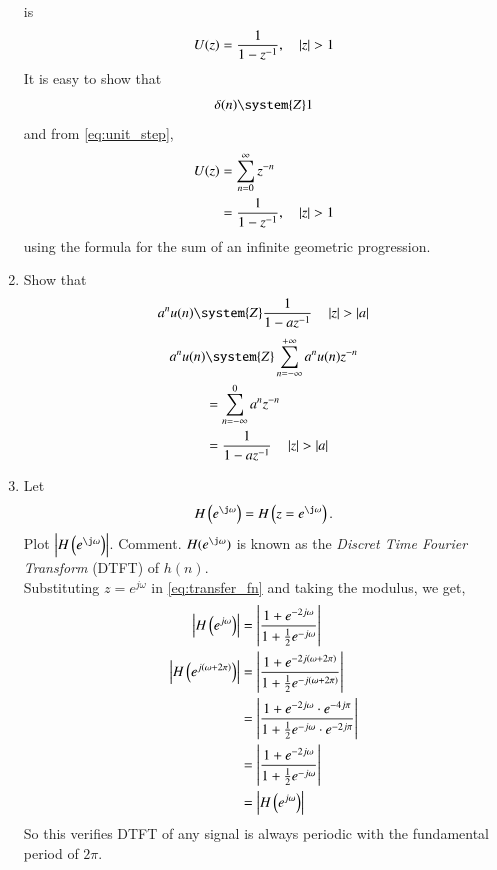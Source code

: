 \documentclass[journal,12pt,twocolumn]{IEEEtran}
\theoremstyle{remark}
\begin{document}
\begin{enumerate}[label=\thesection.\arabic*]
\begin{equation}
\end{equation}
is
\begin{equation}
U(z) = \frac{1}{1-z^{-1}}, \quad \left\vert z\right\vert > 1
\end{equation}
\solution It is easy to show that
\begin{equation}
\delta(n) \system{Z} 1
\end{equation}
and from \eqref{eq:unit_step},
\begin{align}
U(z) &= \sum _{n= 0}^{\infty}z^{-n}
\\
&=\frac{1}{1-z^{-1}}, \quad \left\vert z\right\vert > 1
\end{align}
using the formula for the sum of an infinite geometric progression.
%
\item Show that 
\begin{equation}
\label{eq:anun}
a^nu(n) \system{Z} \frac{1}{1-az^{-1}} \quad \abs{z} > \abs{a}
\end{equation}
\solution 
\begin{align}
    a^nu(n) &\system{Z} \sum_{n=-\infty}^{+\infty}a^nu(n)z^{-n}\\
    &=\sum_{n=-\infty}^{0}a^nz^{-n} \\
    &=\frac{1}{1-az^{-1}} \quad \abs{z} > \abs{a}
\end{align}
%
\item 
Let
\begin{equation}
H\brak{e^{\j \omega}} = H\brak{z = e^{\j \omega}}.
\end{equation}
Plot $\abs{H\brak{e^{\j \omega}}}$.  Comment.  $H(e^{\j \omega})$ is
known as the {\em Discret Time Fourier Transform} (DTFT) of $h(n)$.
\\
\solution
Substituting $z=e^{j\omega}$ in \eqref{eq:transfer_fn} and taking the modulus, we get,
\begin{align}
    \left|H\left(e^{j\omega}\right)\right|&=\left|\frac{1+e^{-2j\omega}}{1+\frac{1}{2}e^{-j\omega}}\right| \\
    \left|H\left(e^{j\left(\omega+2\pi\right)}\right)\right|&=\left|\frac{1+e^{-2j\left(\omega+2\pi\right)}}{1+\frac{1}{2}e^{-j\left(\omega+2\pi\right)}}\right| \\
    &=\left|\frac{1+e^{-2j\omega}\cdot e^{-4j\pi}}{1+\frac{1}{2}e^{-j\omega}\cdot e^{-2j\pi}}\right| \\
    &=\left|\frac{1+e^{-2j\omega}}{1+\frac{1}{2}e^{-j\omega}}\right|\\
    &=\left|H\left(e^{j\omega}\right)\right|
\end{align}
So this verifies DTFT of any signal is always periodic with the fundamental period of $2\pi$.

\end{enumerate}
\end{document}
